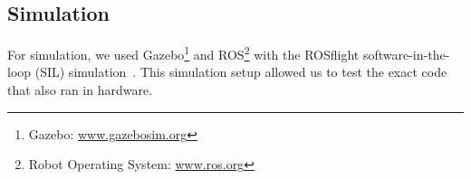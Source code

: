 
\subsection{Simulation}

For simulation, we used Gazebo\footnote{Gazebo:
\url{www.gazebosim.org}}
and ROS\footnote{Robot Operating System:
\url{www.ros.org}}
with the ROSflight software-in-the-loop
(SIL) simulation~\cite{jackson2016rosflight}. This simulation setup allowed us to test
the exact code that also ran in hardware.


